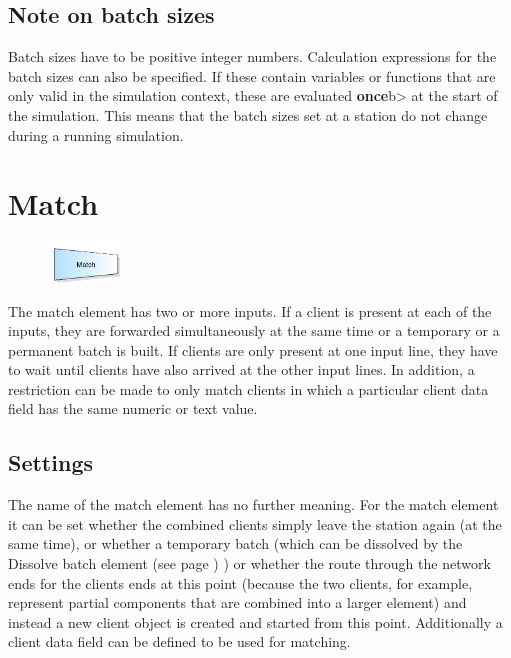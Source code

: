 \subsection*{Note on batch sizes}

Batch sizes have to be positive integer numbers.
Calculation expressions for the batch sizes can also be specified.
If these contain variables or functions that are only valid in the simulation context, these are evaluated \textbf{once}b> at the start of the simulation.
This means that the batch sizes set at a station do not change during a running simulation.


\section{Match}
\label{ref:ModelElementMatch}

\begin{figure}
\vspace{-22pt}
\includegraphics[width=2cm]{imageModelElementMatch.png}
\vspace{-22pt}
\end{figure}

The match element has two or more inputs. If a client is present at each of the inputs, they are forwarded simultaneously
at the same time or a temporary or a permanent batch is built. If clients are only present at one input line, they have
to wait until clients have also arrived at the other input lines.
In addition, a restriction can be made to only match clients in which a particular client data field has the same
numeric or text value.

\subsection*{Settings}

The name of the match element has no further meaning. For the match element it can be set whether the combined
clients simply leave the station again (at the same time), or whether a temporary batch (which
can be dissolved by the Dissolve batch element (see page \pageref{ref:ModelElementSeparate}) ) or whether the route
through the network ends for the clients ends at this point (because the two clients, for example, represent
partial components that are combined into a larger element) and instead a new client object is created and
started from this point. Additionally a client data field can be defined to be used for matching.


